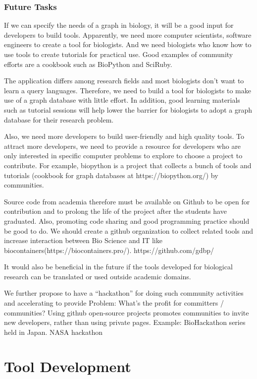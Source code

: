 \documentclass[runningheads]{llncs}
\begin{document}
\subsubsection{Future Tasks}
If we can specify the needs of a graph in biology, it will be a good input for developers to build tools. Apparently, we need more computer scientists, software engineers to create a tool for biologists. And we need biologists who know how to use tools to create tutorials for practical use. Good examples of community efforts are a cookbook such as BioPython and SciRuby.

The application differs among research fields and most biologists don’t want to learn a query languages. Therefore, we need to build a tool for biologists to make use of a graph database with little effort. In addition, good learning materials such as tutorial sessions will help lower the barrier for biologists to adopt a graph database for their research problem.

Also, we need more developers to build user-friendly and high quality tools. To attract more developers, we need to provide a resource for developers who are only interested in specific computer problems to explore to choose a project to contribute. For example, biopython is a project that collects a bunch of tools and tutorials (cookbook for graph databases at https://biopython.org/) by communities. 

Source code from academia therefore must be available on Github to be open for contribution and to prolong the life of the project after the students have graduated. Also, promoting code sharing and good programming practice should be good to do.
We should create a github organization to collect related tools and increase interaction between Bio Science and IT like biocontainers(https://biocontainers.pro/). https://github.com/gdbp/ 

It would also be beneficial in the future if the tools developed for biological research can be translated or used outside academic domains.




We further propose to have a “hackathon” for doing such community activities and accelerating to provide 
Problem: What’s the profit for committers / communities?
Using github open-source projects promotes communities to invite new developers, rather than using private pages.
Example: BioHackathon series held in Japan. NASA hackathon 




\section{Tool Development}
\end{document}
